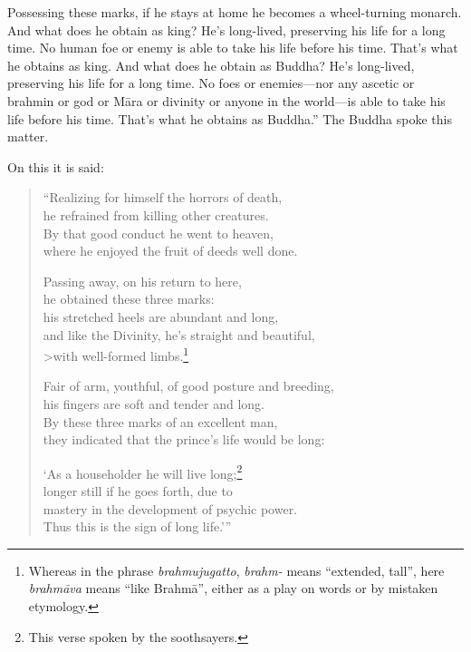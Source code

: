 \documentclass[12pt,openany]{book}%
\begin{document}
Possessing these marks, if he stays at home he becomes a wheel-turning monarch. And what does he obtain as king? He’s long-lived, preserving his life for a long time. No human foe or enemy is able to take his life before his time. That’s what he obtains as king. And what does he obtain as Buddha? He’s long-lived, preserving his life for a long time. No foes or enemies—nor any ascetic or brahmin or god or \textsanskrit{Māra} or divinity or anyone in the world—is able to take his life before his time. That’s what he obtains as Buddha.” The Buddha spoke this matter. 

On this it is said: 

\begin{verse}%
“Realizing for himself the horrors of death, \\
he refrained from killing other creatures. \\
By that good conduct he went to heaven, \\
where he enjoyed the fruit of deeds well done. 

Passing away, on his return to here, \\
he obtained these three marks: \\
his stretched heels are abundant and long, \\
and like the Divinity, he’s straight and beautiful, \\>with well-formed limbs.\footnote{Whereas in the phrase \textit{brahmujugatto}, \textit{brahm-} means “extended, tall”, here \textit{\textsanskrit{brahmāva}} means “like \textsanskrit{Brahmā}”, either as a play on words or by mistaken etymology. } 

Fair of arm, youthful, of good posture and breeding, \\
his fingers are soft and tender and long. \\
By these three marks of an excellent man, \\
they indicated that the prince’s life would be long: 

‘As a householder he will live long;\footnote{This verse spoken by the soothsayers. } \\
longer still if he goes forth, due to \\
mastery in the development of psychic power. \\
Thus this is the sign of long life.’” 

%
\end{verse}
\end{document}
